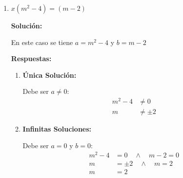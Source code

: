\documentclass[12pt]{article}
\newcommand{\solucion}{%
    \vspace{0.8em}%
    \textbf{Solución:}%
}
\begin{document}
\begin{enumerate}[label=\roman*)]
    \textbf{Respuestas:}

    \begin{enumerate}[label=\alph*)]
    \item \textbf{Única Solución:} $m \in \mathbb{R} - \{1\}$
    \item \textbf{Infinitas Soluciones:} $m = 1$
    \item \textbf{Ninguna Solución:} No existe valor de $m$
    \item \textbf{Solución $x = 4$:}

    Para tener solución única debe ser:
    \begin{align*}
    x &= \dfrac{b}{a} = \dfrac{m^2 - 1}{1 - m} = 4 \\[0.3em]
    m^2 - 1 &= 4 - 4m \\[0.3em]
    m^2 + 4m &= 5 \\[0.3em]
    m^2 + 4m - 5 &= 0 \\[0.3em]
    (m + 5)(m - 1) &= 0
    \end{align*}

    Por lo tanto: $m_1 = -5$ o $m_2 = 1$

    Luego: $\boxed{CS = \{1, -5\}}$
    \end{enumerate}

    \item $x(m^2 - 4) = (m - 2)$

    \solucion

    En este caso se tiene $a = m^2 - 4$ y $b = m - 2$

    \textbf{Respuestas:}

    \begin{enumerate}[label=\alph*)]
    \item \textbf{Única Solución:}

    Debe ser $a \neq 0$:
    \begin{align*}
    m^2 - 4 &\neq 0 \\
    m &\neq \pm 2
    \end{align*}

    \item \textbf{Infinitas Soluciones:}

    Debe ser $a = 0$ y $b = 0$:
    \begin{align*}
    m^2 - 4 &= 0 \quad \land \quad m - 2 = 0 \\
    m &= \pm 2 \quad \land \quad m = 2 \\
    m &= 2
    \end{align*}


\end{enumerate}
\end{enumerate}
\end{document}
